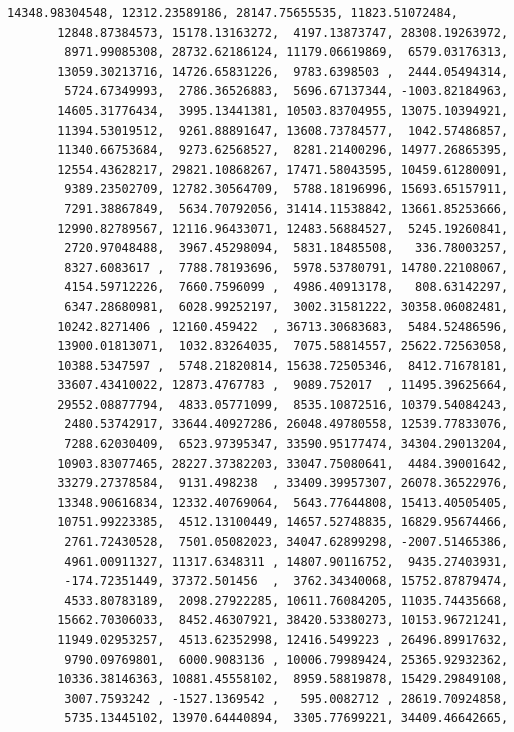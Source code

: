 \documentclass[11pt,a4paper]{report}
\begin{document}
\begin{tcolorbox}[breakable, size=fbox, boxrule=.5pt, pad at break*=1mm, opacityfill=0]
\begin{Verbatim}[commandchars=\\\{\}]
       14348.98304548, 12312.23589186, 28147.75655535, 11823.51072484,
       12848.87384573, 15178.13163272,  4197.13873747, 28308.19263972,
        8971.99085308, 28732.62186124, 11179.06619869,  6579.03176313,
       13059.30213716, 14726.65831226,  9783.6398503 ,  2444.05494314,
        5724.67349993,  2786.36526883,  5696.67137344, -1003.82184963,
       14605.31776434,  3995.13441381, 10503.83704955, 13075.10394921,
       11394.53019512,  9261.88891647, 13608.73784577,  1042.57486857,
       11340.66753684,  9273.62568527,  8281.21400296, 14977.26865395,
       12554.43628217, 29821.10868267, 17471.58043595, 10459.61280091,
        9389.23502709, 12782.30564709,  5788.18196996, 15693.65157911,
        7291.38867849,  5634.70792056, 31414.11538842, 13661.85253666,
       12990.82789567, 12116.96433071, 12483.56884527,  5245.19260841,
        2720.97048488,  3967.45298094,  5831.18485508,   336.78003257,
        8327.6083617 ,  7788.78193696,  5978.53780791, 14780.22108067,
        4154.59712226,  7660.7596099 ,  4986.40913178,   808.63142297,
        6347.28680981,  6028.99252197,  3002.31581222, 30358.06082481,
       10242.8271406 , 12160.459422  , 36713.30683683,  5484.52486596,
       13900.01813071,  1032.83264035,  7075.58814557, 25622.72563058,
       10388.5347597 ,  5748.21820814, 15638.72505346,  8412.71678181,
       33607.43410022, 12873.4767783 ,  9089.752017  , 11495.39625664,
       29552.08877794,  4833.05771099,  8535.10872516, 10379.54084243,
        2480.53742917, 33644.40927286, 26048.49780558, 12539.77833076,
        7288.62030409,  6523.97395347, 33590.95177474, 34304.29013204,
       10903.83077465, 28227.37382203, 33047.75080641,  4484.39001642,
       33279.27378584,  9131.498238  , 33409.39957307, 26078.36522976,
       13348.90616834, 12332.40769064,  5643.77644808, 15413.40505405,
       10751.99223385,  4512.13100449, 14657.52748835, 16829.95674466,
        2761.72430528,  7501.05082023, 34047.62899298, -2007.51465386,
        4961.00911327, 11317.6348311 , 14807.90116752,  9435.27403931,
        -174.72351449, 37372.501456  ,  3762.34340068, 15752.87879474,
        4533.80783189,  2098.27922285, 10611.76084205, 11035.74435668,
       15662.70306033,  8452.46307921, 38420.53380273, 10153.96721241,
       11949.02953257,  4513.62352998, 12416.5499223 , 26496.89917632,
        9790.09769801,  6000.9083136 , 10006.79989424, 25365.92932362,
       10336.38146363, 10881.45558102,  8959.58819878, 15429.29849108,
        3007.7593242 , -1527.1369542 ,   595.0082712 , 28619.70924858,
        5735.13445102, 13970.64440894,  3305.77699221, 34409.46642665,

\end{Verbatim}
\end{tcolorbox}
\end{document}
